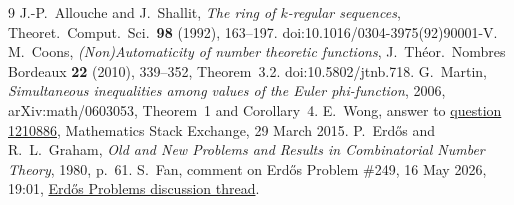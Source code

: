 \documentclass[11pt]{article}
\begin{document}
\begin{thebibliography}{9}\small
{} J.-P.~Allouche and J.~Shallit,
\emph{The ring of $k$-regular sequences}, Theoret.\ Comput.\ Sci.\
\textbf{98} (1992), 163--197. doi:10.1016/0304-3975(92)90001-V.
 M.~Coons, \emph{(Non)Automaticity of number theoretic
functions}, J.\ Th\'eor.\ Nombres Bordeaux \textbf{22} (2010), 339--352,
Theorem~3.2. doi:10.5802/jtnb.718.
 G.~Martin, \emph{Simultaneous inequalities
among values of the Euler phi-function}, 2006, arXiv:math/0603053,
Theorem~1 and Corollary~4.
 E.~Wong, answer to
\href{https://math.stackexchange.com/questions/1210886}{question 1210886},
Mathematics Stack Exchange, 29 March 2015.
 P.~Erd\H{o}s and R.~L.~Graham,
\emph{Old and New Problems and Results in Combinatorial Number Theory},
1980, p.~61.
 S.~Fan, comment on Erd\H{o}s Problem \#249,
16 May 2026, 19:01, \href{https://www.erdosproblems.com/forum/thread/249}
{Erd\H{o}s Problems discussion thread}.
\end{thebibliography}
\end{document}
